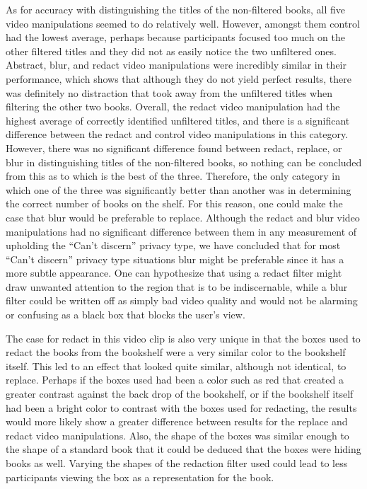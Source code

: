 \documentclass{acm_proc_article-sp}
\begin{document}
As for accuracy with distinguishing the titles of the non-filtered books, all five video manipulations seemed to do relatively well. However, amongst them control had the lowest average, perhaps because participants focused too much on the other filtered titles and they did not as easily notice the two unfiltered ones. Abstract, blur, and redact video manipulations were incredibly similar in their performance, which shows that although they do not yield perfect results, there was definitely no distraction that took away from the unfiltered titles when filtering the other two books. Overall, the redact video manipulation had the highest average of correctly identified unfiltered titles, and there is a significant difference between the redact and control video manipulations in this category. However, there was no significant difference found between redact, replace, or blur in distinguishing titles of the non-filtered books, so nothing can be concluded from this as to which is the best of the three. Therefore, the only category in which one of the three was significantly better than another was in determining the correct number of books on the shelf. For this reason, one could make the case that blur would be preferable to replace. Although the redact and blur video manipulations had no significant difference between them in any measurement of upholding the ``Can't discern'' privacy type, we have concluded that for most ``Can't discern'' privacy type situations blur might be preferable since it has a more subtle appearance. One can hypothesize that using a redact filter might draw unwanted attention to the region that is to be indiscernable, while a blur filter could be written off as simply bad video quality and would not be alarming or confusing as a black box that blocks the user's view. 

The case for redact in this video clip is also very unique in that the boxes used to redact the books from the bookshelf were a very similar color to the bookshelf itself. This led to an effect that looked quite similar, although not identical, to replace. Perhaps if the boxes used had been a color such as red that created a greater contrast against the back drop of the bookshelf, or if the bookshelf itself had been a bright color to contrast with the boxes used for redacting, the results would more likely show a greater difference between results for the replace and redact video manipulations. Also, the shape of the boxes was similar enough to the shape of a standard book that it could be deduced that the boxes were hiding books as well. Varying the shapes of the redaction filter used could lead to less participants viewing the box as a representation for the book.  
\end{document}

